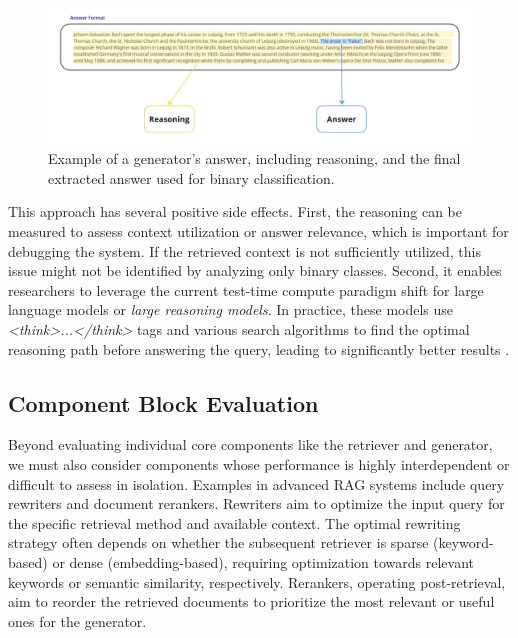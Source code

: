 \begin{figure}[!ht]
  \centering
  \includegraphics[width=\textwidth]{images/Answer-vs-Reasoning.pdf}
  \caption{Example of a generator's answer, including reasoning, and the final extracted answer used for binary classification.}
  \label{fig:answerreason}
\end{figure}

This approach has several positive side effects. First, the reasoning can be measured to assess context utilization or answer relevance, which is important for debugging the system. If the retrieved context is not sufficiently utilized, this issue might not be identified by analyzing only binary classes. Second, it enables researchers to leverage the current test-time compute paradigm shift for large language models or \textit{large reasoning models}. In practice, these models use \textit{<think>...</think>} tags and various search algorithms to find the optimal reasoning path before answering the query, leading to significantly better results \cite{Xu.16.01.2025}.


\subsection{Component Block Evaluation}

Beyond evaluating individual core components like the retriever and generator, we must also consider components whose performance is highly interdependent or difficult to assess in isolation. Examples in advanced RAG systems include query rewriters and document rerankers. Rewriters aim to optimize the input query for the specific retrieval method and available context. The optimal rewriting strategy often depends on whether the subsequent retriever is sparse (keyword-based) or dense (embedding-based), requiring optimization towards relevant keywords or semantic similarity, respectively. Rerankers, operating post-retrieval, aim to reorder the retrieved documents to prioritize the most relevant or useful ones for the generator.


